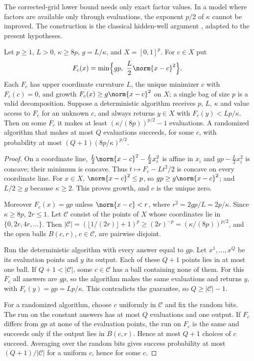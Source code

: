 The corrected-grid lower bound needs only exact factor values. In a model
where factors are available only through evaluations, the exponent $p/2$ of
$\kappa$ cannot be improved. The construction is the classical hidden-well
argument \cite{NemirovskiYudin1983}, adapted to the present hypotheses.

\begin{proposition}\label{lim:prop:oracle}
Let $p\ge1$, $L>0$, $\kappa\ge8p$, $g=L/\kappa$, and $X=[0,1]^p$. For
$c\in X$ put
\[
F_c(x)=\min\Bigl\{gp,\ \frac L2\norm{x-c}^2\Bigr\}.
\]
Each $F_c$ has upper coordinate curvature $L$, the unique minimizer $c$
with $F_c(c)=0$, and growth $F_c(x)\ge g\norm{x-c}^2$ on $X$; a single
bag of size $p$ is a valid decomposition. Suppose a deterministic algorithm
receives $p$, $L$, $\kappa$ and value access to $F_c$ for an unknown $c$,
and always returns $y\in X$ with $F_c(y)<Lp/\kappa$. Then on some $F_c$ it
makes at least $(\kappa/(8p))^{p/2}-1$ evaluations. A randomized algorithm
that makes at most $Q$ evaluations succeeds, for some $c$, with probability
at most $(Q+1)(8p/\kappa)^{p/2}$.
\end{proposition}

\begin{proof}
On a coordinate line, $\frac L2\norm{x-c}^2-\frac L2x_i^2$ is affine in
$x_i$ and $gp-\frac L2x_i^2$ is concave; their minimum is concave. Thus
$t\mapsto F_c-Lt^2/2$ is concave on every coordinate line. For $x\in X$,
$\norm{x-c}^2\le p$, so $gp\ge g\norm{x-c}^2$; and $L/2\ge g$ because
$\kappa\ge2$. This proves growth, and $c$ is the unique zero.

Moreover $F_c(x)=gp$ unless $\norm{x-c}<r$, where $r^2=2gp/L=2p/\kappa$.
Since $\kappa\ge8p$, $2r\le1$. Let $\mathcal C$ consist of the points of
$X$ whose coordinates lie in $\{0,2r,4r,\ldots\}$. Then
$|\mathcal C|=(\lfloor1/(2r)\rfloor+1)^p\ge(2r)^{-p}=(\kappa/(8p))^{p/2}$,
and the open balls $B(c,r)$, $c\in\mathcal C$, are pairwise disjoint.

Run the deterministic algorithm with every answer equal to $gp$. Let
$x^1,\ldots,x^Q$ be its evaluation points and $y$ its output. Each of these
$Q+1$ points lies in at most one ball. If $Q+1<|\mathcal C|$, some
$c\in\mathcal C$ has a ball containing none of them. For this $F_c$ all
answers are $gp$, so the algorithm makes the same evaluations and returns
$y$, with $F_c(y)=gp=Lp/\kappa$. This contradicts the guarantee, so
$Q\ge|\mathcal C|-1$.

For a randomized algorithm, choose $c$ uniformly in $\mathcal C$ and fix
the random bits. The run on the constant answers has at most $Q$
evaluations and one output. If $F_c$ differs from $gp$ at none of the
evaluation points, the run on $F_c$ is the same and succeeds only if the
output lies in $B(c,r)$. Hence at most $Q+1$ choices of $c$ succeed.
Averaging over the random bits gives success probability at most
$(Q+1)/|\mathcal C|$ for a uniform $c$, hence for some $c$.
\end{proof}

